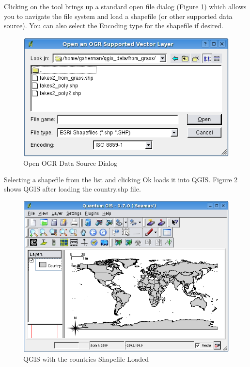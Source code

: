 Clicking on the tool brings up a standard open file dialog (Figure
\ref{fig:openshapefile}) which allows you to navigate the file system and load
a shapefile (or other supported data source).  You can also select the
Encoding type for the shapefile if desired.
\begin{figure}[h]
   \begin{center}
   \caption{Open OGR Data Source Dialog}\label{fig:openshapefile}\smallskip
   \includegraphics[scale=.75]{qgis_user_guide_images/shapefileopendialog}
\end{center}  
   
\end{figure}
Selecting a shapefile from the list and clicking Ok loads it into QGIS. Figure
\ref{fig:loadedshapefile} shows QGIS after loading the country.shp file.
\begin{figure}[h]
   \begin{center}
   \caption{QGIS with the countries Shapefile Loaded}\label{fig:loadedshapefile}\smallskip
   \includegraphics[scale=.7]{qgis_user_guide_images/shapefileloaded}
\end{center}  
   
\end{figure}
\begin{Tip}\caption{\textsc{Layer Colors}}
\end{Tip}

